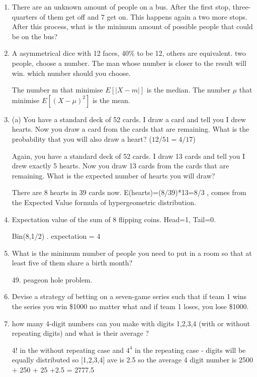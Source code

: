 \documentclass{article}
\begin{document}
\begin{enumerate}
    \item There are an unknown amount of people on a bus. After the first stop, three-quarters of them get off and 7 get on. This happens again a two more stops. After this process, what is the minimum amount of possible people that could be on the bus?

    \item A asymmetrical dice with 12 faces, 40\% to be 12, others are equivalent. two people, choose a number. The man whose number is closer to the result will win. which number should you choose.

    The number m that minimise $E[|X-m|] $ is the median. The number $\mu$ that minimise $E[(X-\mu)^2]$ is the mean. 


    \item (a) You have a standard deck of 52 cards. I draw a card and tell you I drew hearts. Now you draw a card from the cards that are remaining. What is the probability that you will also draw a heart? ($12/51 = 4/17$)
    
    Again, you have a standard deck of 52 cards. I draw 13 cards and tell you I drew exactly 5 hearts. Now you draw 13 cards from the cards that are remaining. What is the expected number of hearts you will draw?

     There are 8 hearts in 39 cards now. E(hearts)=(8/39)*13=8/3 , comes from the Expected Value formula of hypergeometric distribution. 

     \item Expectation value of the sum of 8 flipping coins. Head=1, Tail=0. 

     Bin(8,1/2) . expectation = 4

    \item What is the minimum number of people you need to put in a room so that at least five of them share a birth month?

    49. peageon hole problem.

    \item Devise a strategy of betting on a seven-game series such that if team 1 wins the series you win \$1000 no matter what and if team 1 loses, you lose \$1000.

    \item how many 4-digit numbers can you make with digits 1,2,3,4 (with or without repeating digits) and what is their average ?

    4! in the without repeating case and $4^4$ in the repeating case - digits will be equally distributed so [1,2,3,4] ave is 2.5 so the average 4 digit number is 2500 + 250 + 25 +2.5 = 2777.5


\end{enumerate}
\end{document}

